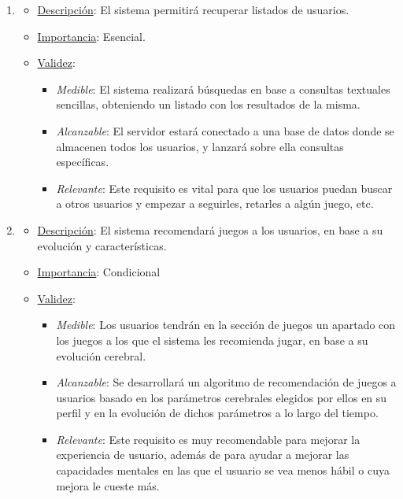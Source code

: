 \begin{enumerate}
\item %
  \begin{itemize}
  \item \underline{Descripción}: El sistema permitirá recuperar listados de usuarios.
  \item \underline{Importancia}: Esencial.
  \item \underline{Validez}:
    \begin{itemize}
    \item \textit{Medible}: El sistema realizará búsquedas en base a consultas textuales sencillas, obteniendo un listado con los resultados de la misma.
    \item \textit{Alcanzable}: El servidor estará conectado a una base de datos donde se almacenen todos los usuarios, y lanzará sobre ella consultas específicas.
    \item \textit{Relevante}: Este requisito es vital para que los usuarios puedan buscar a otros usuarios y empezar a seguirles, retarles a algún juego, etc.
    \end{itemize}
  \end{itemize}

\item %
  \begin{itemize}
  \item \underline{Descripción}: El sistema recomendará juegos a los usuarios, en base a su evolución y características.
  \item \underline{Importancia}: Condicional
  \item \underline{Validez}:
    \begin{itemize}
    \item \textit{Medible}: Los usuarios tendrán en la sección de juegos un apartado con los juegos a los que el sistema les recomienda jugar, en base a su evolución cerebral.
    \item \textit{Alcanzable}: Se desarrollará un algoritmo de recomendación de juegos a usuarios basado en los parámetros cerebrales elegidos por ellos en su perfil y en la evolución de dichos parámetros a lo largo del tiempo.
    \item \textit{Relevante}: Este requisito es muy recomendable para mejorar la experiencia de usuario, además de para ayudar a mejorar las capacidades mentales en las que el usuario se vea menos hábil o cuya mejora le cueste más.
    \end{itemize}
  \end{itemize}


\end{enumerate}
